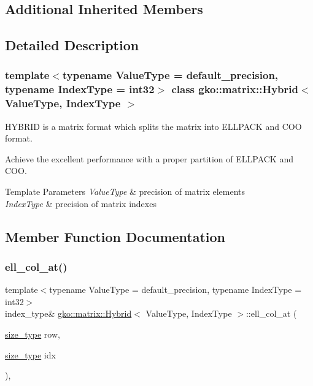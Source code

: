 \subsection*{Additional Inherited Members}


\subsection{Detailed Description}
\subsubsection*{template$<$typename Value\+Type = default\+\_\+precision, typename Index\+Type = int32$>$\newline
class gko\+::matrix\+::\+Hybrid$<$ Value\+Type, Index\+Type $>$}

H\+Y\+B\+R\+ID is a matrix format which splits the matrix into E\+L\+L\+P\+A\+CK and C\+OO format. 

Achieve the excellent performance with a proper partition of E\+L\+L\+P\+A\+CK and C\+OO.


\begin{DoxyTemplParams}{Template Parameters}
{\em Value\+Type} & precision of matrix elements \\
\hline
{\em Index\+Type} & precision of matrix indexes \\
\hline
\end{DoxyTemplParams}


\subsection{Member Function Documentation}
\mbox{\label{classgko_1_1matrix_1_1Hybrid_ad41c68dbda50589378ad481c0ab8feea}} 
\subsubsection{\texorpdfstring{ell\+\_\+col\+\_\+at()}{ell\_col\_at()}\hspace{0.1cm}{\footnotesize\ttfamily [1/2]}}
{\footnotesize\ttfamily template$<$typename Value\+Type = default\+\_\+precision, typename Index\+Type = int32$>$ \\
index\+\_\+type\& \hyperlink{classgko_1_1matrix_1_1Hybrid}{gko\+::matrix\+::\+Hybrid}$<$ Value\+Type, Index\+Type $>$\+::ell\+\_\+col\+\_\+at (\begin{DoxyParamCaption}\item[{\hyperlink{namespacegko_a6e5c95df0ae4e47aab2f604a22d98ee7}{size\+\_\+type}}]{row,  }\item[{\hyperlink{namespacegko_a6e5c95df0ae4e47aab2f604a22d98ee7}{size\+\_\+type}}]{idx }\end{DoxyParamCaption})\hspace{0.3cm}{\ttfamily [inline]}, {\ttfamily [noexcept]}}



